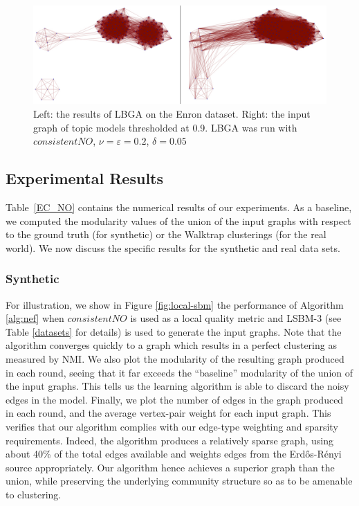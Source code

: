 \documentclass{article}
\newcommand{\er}{Erd\H{o}s-R\'{e}nyi }
\begin{document}
\begin{figure}[t]
\begin{centering}
\includegraphics[width=\columnwidth]{figures/enron-comparison.pdf}
\par\end{centering}
\caption{Left: the results of LBGA on the Enron dataset. Right: the input graph
of topic models thresholded at 0.9. LBGA was run with $consistentNO$, $\nu =
\varepsilon = 0.2$, $\delta = 0.05$} 
\label{fig:enron-comparison}
\end{figure}


\subsection{Experimental Results}
\label{sec:results}

Table~\ref{EC_NO} contains the numerical results of our experiments. As a
baseline, we computed the modularity values of the union of the input
graphs with respect to the ground truth (for synthetic) or the Walktrap
clusterings (for the real world). We now discuss the specific results for the
synthetic and real data sets. 

\subsubsection{Synthetic}
For illustration, we show in Figure \ref{fig:local-sbm} the performance of
Algorithm \ref{alg:nef} when $consistentNO$ is used as a local quality metric
and LSBM-3 (see Table \ref{datasets} for details) is used to generate the input
graphs. Note that the algorithm converges quickly to a graph which results in a
perfect clustering as measured by NMI. We also plot the modularity of the
resulting graph produced in each round, seeing that it far exceeds the
``baseline'' modularity of the union of the input graphs. This tells us the
learning algorithm is able to discard the noisy edges in the model. Finally, we
plot the number of edges in the graph produced in each round, and the average
vertex-pair weight for each input graph. This verifies that our algorithm
complies with our edge-type weighting and sparsity requirements. Indeed, the
algorithm produces a relatively sparse graph, using about 40\% of the total
edges available and weights edges from the \er source appropriately.  Our
algorithm hence achieves a superior graph than the union, while preserving the
underlying community structure so as to be amenable to clustering. 
\end{document}
